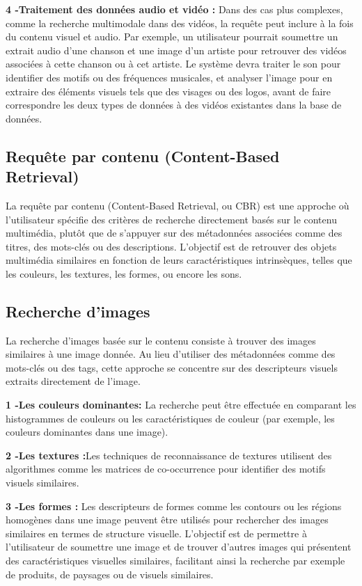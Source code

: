 \begin{section}
 \textbf{4 -Traitement des données audio et vidéo :}
 Dans des cas plus complexes, comme la recherche multimodale dans des vidéos, la requête peut inclure à la fois du
 contenu visuel et audio. Par exemple, un utilisateur pourrait soumettre un extrait audio d'une chanson et une image
 d'un artiste pour retrouver des vidéos associées à cette chanson ou à cet artiste. Le système devra traiter le son
 pour identifier des motifs ou des fréquences musicales, et analyser l'image pour en extraire des éléments visuels
 tels que des visages ou des logos, avant de faire correspondre les deux types de données à des vidéos existantes
 dans la base de données.

 \section{Requête par contenu (Content-Based Retrieval)}
 La requête par contenu (Content-Based Retrieval, ou CBR) est une approche où
 l'utilisateur spécifie des critères de recherche directement basés sur le
 contenu multimédia, plutôt que de s'appuyer sur des métadonnées associées comme
 des titres, des mots-clés ou des descriptions. L'objectif est de retrouver des
 objets multimédia similaires en fonction de leurs caractéristiques
 intrinsèques, telles que les couleurs, les textures, les formes, ou encore les
 sons.
 \subsection{Recherche d'images}
 La recherche d'images basée sur le contenu consiste à trouver des images
 similaires à une image donnée. Au lieu d'utiliser des métadonnées comme des
 mots-clés ou des tags, cette approche se concentre sur des descripteurs visuels
 extraits directement de l'image. \par \textbf{1 -Les couleurs dominantes:}
 La recherche peut être effectuée en comparant les histogrammes de couleurs ou
 les caractéristiques de couleur (par exemple, les couleurs dominantes dans une
 image). \par \textbf{2 -Les textures :}Les techniques de reconnaissance de
 textures utilisent des algorithmes comme les matrices de co-occurrence pour
 identifier des motifs visuels similaires.
 \par \textbf{3 -Les formes :}
 Les descripteurs de formes comme les contours ou les régions homogènes dans une image peuvent être utilisés pour
 rechercher des images similaires en termes de structure visuelle. L'objectif est de permettre à l'utilisateur de
 soumettre une image et de trouver d'autres images qui présentent des caractéristiques visuelles similaires,
 facilitant ainsi la recherche par exemple de produits, de paysages ou de visuels similaires.

\end{section}
